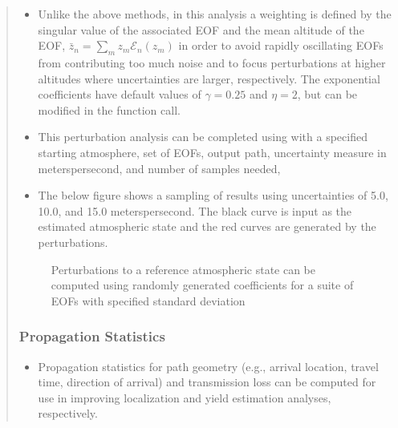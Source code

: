 \documentclass[letterpaper,10pt,english]{sphinxmanual}
\let\sphinxpxdimen\pdfpxdimen\else\newdimen\sphinxpxdimen
\begin{document}
\begin{itemize}
\begin{quote}
\begin{itemize}
\item {} 
Unlike the above methods, in this analysis a weighting is defined by the singular value of the associated EOF and the mean altitude of the EOF, \(\bar{z}_n = \sum_m{z_m \mathcal{E}_n \left( z_m \right)}\) in order to avoid rapidly oscillating EOFs from contributing too much noise and to focus perturbations at higher altitudes where uncertainties are larger, respectively.  The exponential coefficients have default values of \(\gamma = 0.25\) and \(\eta=2\), but can be modified in the function call.

\item {} 
This perturbation analysis can be completed using  with a specified starting atmosphere, set of EOFs, output path, uncertainty measure in meters\sphinxhyphen{}per\sphinxhyphen{}second, and number of samples needed,

\end{itemize}

\begin{sphinxVerbatim}[commandchars=\\\{\}]
    
\end{sphinxVerbatim}
\begin{itemize}
\item {} 
The below figure shows a sampling of results using uncertainties of 5.0, 10.0, and 15.0 meters\sphinxhyphen{}per\sphinxhyphen{}second.  The black curve is input as the estimated atmospheric state and the red curves are generated by the perturbations.

\end{itemize}

\begin{figure}[htbp]
\centering
\capstart

\noindent\sphinxincludegraphics[width=500\sphinxpxdimen]{{atmo_perturb}.png}
\caption{Perturbations to a reference atmospheric state can be computed using randomly generated coefficients for a suite of EOFs with specified standard deviation}\label{\detokenize{sampling:id3}}\end{figure}


\subsubsection{Propagation Statistics}
\label{\detokenize{propagation:propagation-statistics}}\label{\detokenize{propagation:propagation}}\label{\detokenize{propagation::doc}}\begin{itemize}
\item {} 
Propagation statistics for path geometry (e.g., arrival location, travel time, direction of arrival) and transmission loss can be computed for use in improving localization and yield estimation analyses, respectively.


\end{itemize}
\end{quote}
\end{itemize}
\end{document}
